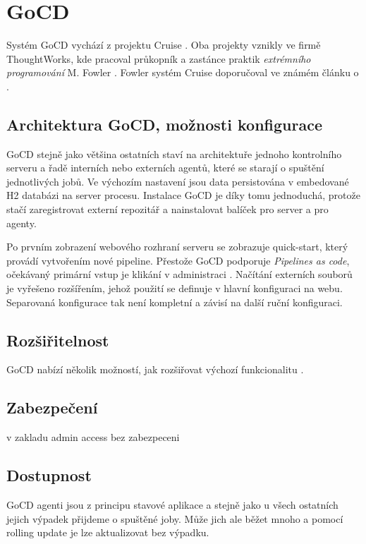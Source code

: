 \section{GoCD}
    Systém GoCD vychází z projektu Cruise \cite{thoughtworks-gocd}. Oba projekty vznikly ve firmě ThoughtWorks, kde pracoval průkopník a zastánce praktik \textit{extrémního programování} M. Fowler \cite{fowler-go}. Fowler systém Cruise doporučoval ve známém článku o \CI \cite{fowler-ci}.

    \subsection{Architektura GoCD, možnosti konfigurace}
        GoCD stejně jako většina ostatních \CI staví na architektuře jednoho kontrolního serveru a řadě interních nebo externích agentů, které se starají o spuštění jednotlivých jobů. Ve výchozím nastavení jsou data persistována v embedované H2 databázi na server procesu. Instalace GoCD je díky tomu jednoduchá, protože stačí zaregistrovat externí repozitář a nainstalovat balíček pro server a pro agenty.

        Po prvním zobrazení webového rozhraní serveru se zobrazuje quick-start, který provádí vytvořením nové pipeline. Přestože GoCD podporuje \textit{Pipelines as code}, očekávaný primární vstup je klikání v administraci \cite{gocd-pas}. Načítání externích souborů je vyřešeno rozšířením, jehož použití se definuje v hlavní  konfiguraci na webu. Separovaná konfigurace tak není kompletní a závisí na další ruční konfiguraci.

    \subsection{Rozšiřitelnost}
        GoCD nabízí několik možností, jak rozšiřovat výchozí funkcionalitu \cite{gocd-extensions}.

\cite{gocd-plugins}
        \blind[3]

    \subsection{Zabezpečení}
        v zakladu admin access bez zabezpeceni
        \blind[3]

    \subsection{Dostupnost}
        GoCD agenti jsou z principu stavové aplikace a stejně jako u všech ostatních \CI jejich výpadek přijdeme o spuštěné joby. Může jich ale běžet mnoho a pomocí rolling update je lze aktualizovat bez výpadku.

